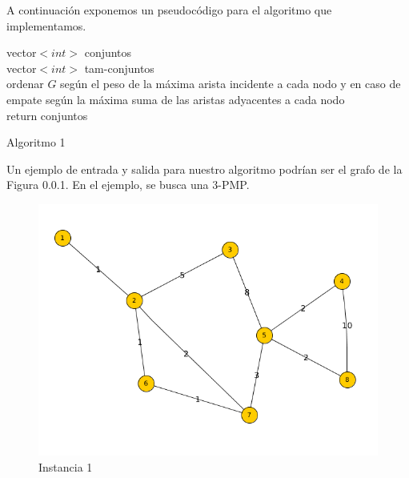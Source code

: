 \documentclass[11pt, a4paper, twoside]{article}
\begin{document}
\begin{enumerate}
\begin{enumerate}
		\end{enumerate}
		
		A continuación exponemos un pseudocódigo para el algoritmo que implementamos. \\
		\begin{algorithm}[H]
		  vector$<int>$ conjuntos \\
		  vector$<int>$ tam-conjuntos \\
		  ordenar $G$ según el peso de la máxima arista incidente a cada nodo y en caso de empate según la máxima suma
		  de las aristas adyacentes a cada nodo \\
		  return conjuntos
		\caption{Algoritmo 1}
		\end{algorithm}
		
		Un ejemplo de entrada y salida para nuestro algoritmo podrían ser el grafo de la 
		Figura 0.0.1. En el ejemplo, se busca una 3-PMP.
		
		\begin{figure}[H]
		\includegraphics[scale=1]{imagenes/ej2.png}
		\caption{Instancia 1}
		\end{figure}
		

\end{enumerate}
\end{document}
